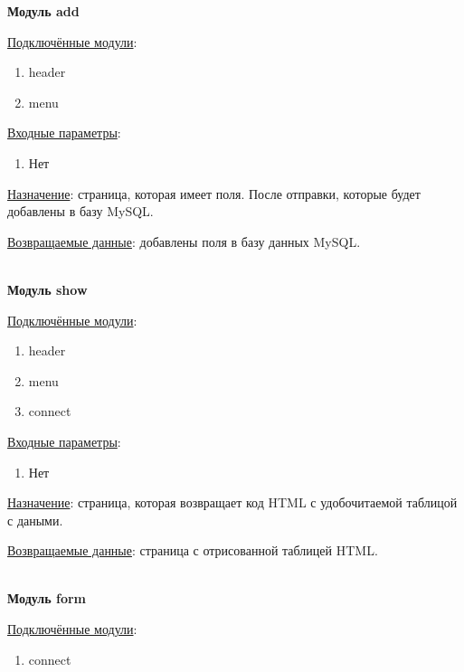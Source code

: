 \textbf{Модуль add}

\underline{Подключённые модули}:

\begin{enumerate}
    \item header
    \item menu
\end{enumerate}

\underline{Входные параметры}:

\begin{enumerate}
    \item Нет
\end{enumerate}

\underline{Назначение}: страница, которая имеет поля. После отправки, которые будет добавлены в базу MySQL.

\underline{Возвращаемые данные}: добавлены поля в базу данных MySQL.

\hspace{0pt}\\


\textbf{Модуль show}

\underline{Подключённые модули}:

\begin{enumerate}
    \item header
    \item menu
    \item connect
\end{enumerate}

\underline{Входные параметры}:

\begin{enumerate}
    \item Нет
\end{enumerate}

\underline{Назначение}: страница, которая возвращает код HTML с удобочитаемой таблицой с даными.

\underline{Возвращаемые данные}: страница с отрисованной таблицей HTML.

\hspace{0pt}\\


\textbf{Модуль form}

\underline{Подключённые модули}:

\begin{enumerate}
    \item connect
\end{enumerate}

